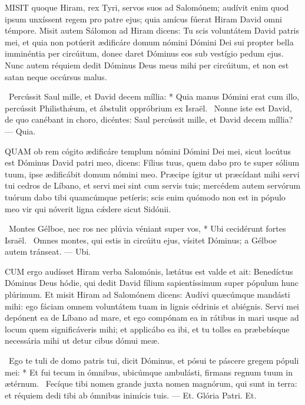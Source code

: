 \lettrine[lines=2]{M}{ISIT} quoque Hiram, rex Tyri, servos suos ad Salomónem; audívit enim quod ipsum unxíssent regem pro patre ejus; quia amícus fúerat Hiram David omni témpore. Misit autem Sálomon ad Hiram dicens: Tu scis voluntátem David patris mei, et quia non potúerit ædificáre domum nómini Dómini Dei sui propter bella imminéntia per circúitum, donec daret Dóminus eos sub vestígio pedum ejus. Nunc autem réquiem dedit Dóminus Deus meus mihi per circúitum, et non est satan neque occúrsus malus.

\R\ Percússit Saul mille, et David decem míllia: * Quia manus Dómini erat cum illo, percússit Philisthǽum, et ábstulit oppróbrium ex Israël. \V\ Nonne iste est David, de quo canébant in choro, dicéntes: Saul percússit mille, et David decem míllia? --- Quia.


\lettrine[lines=2]{Q}{UAM} ob rem cógito ædificáre templum nómini Dómini Dei mei, sicut locútus est Dóminus David patri meo, dicens: Fílius tuus, quem dabo pro te super sólium tuum, ipse ædificábit domum nómini meo. Præcipe ígitur ut præcídant mihi servi tui cedros de Líbano, et servi mei sint cum servis tuis; mercédem autem servórum tuórum dabo tibi quamcúmque petíeris; scis enim quómodo non est in pópulo meo vir qui nóverit ligna cǽdere sicut Sidónii.

\R\ Montes Gélboe, nec ros nec plúvia véniant super vos, * Ubi cecidérunt fortes Israël. \V\ Omnes montes, qui estis in circúitu ejus, vísitet Dóminus; a Gélboe autem tránseat. --- Ubi.



\lettrine[lines=2]{C}{UM} ergo audísset Hiram verba Salomónis, lætátus est valde et ait: Benedíctus Dóminus Deus hódie, qui dedit David fílium sapientíssimum super pópulum hunc plúrimum. Et misit Hiram ad Salomónem dicens: Audívi quæcúmque mandásti mihi: ego fáciam omnem voluntátem tuam in lignis cédrinis et abiégnis. Servi mei depónent ea de Líbano ad mare, et ego compónam ea in rátibus in mari usque ad locum quem significáveris mihi; et applicábo ea ibi, et tu tolles ea præbebísque necessária mihi ut detur cibus dómui meæ.

\R\ Ego te tuli de domo patris tui, dicit Dóminus, et pósui te páscere gregem pópuli mei: * Et fui tecum in ómnibus, ubicúmque ambulásti, firmans regnum tuum in ætérnum. \V\ Fecíque tibi nomen grande juxta nomen magnórum, qui sunt in terra: et réquiem dedi tibi ab ómnibus inimícis tuis. --- Et. Glória Patri. Et.

